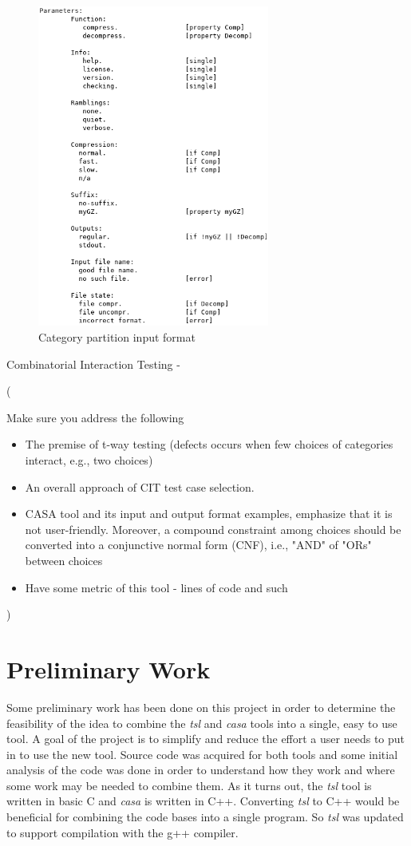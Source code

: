 \documentclass[a4full,12pt]{article}
\newcommand{\eas}[1]{{\color{blue}\sf ({#1})}}
\begin{document}
\begin{figure}[-htb]
\centering
\includegraphics[width=3in,keepaspectratio]{tsl_input.png}
\caption{Category partition input format}
\label{fig:tsl_input}
\end{figure}



Combinatorial Interaction Testing -
\eas{Make sure you address the following
\begin{itemize}
\item The premise of t-way testing (defects occurs when few choices of categories interact, e.g., two choices)
\item An overall approach of CIT test case selection.
\item CASA tool and its input and output format examples, emphasize that it is not user-friendly. Moreover, a compound constraint among choices should be converted into a conjunctive normal form (CNF), i.e., "AND" of "ORs" between choices
\item Have some metric of this tool - lines of code and such
\end{itemize}
}

\section{Preliminary Work}
Some preliminary work has been done on this project in order to determine the
  feasibility of the idea to combine the \emph{tsl} and \emph{casa} tools into 
  a single, easy to use tool. A goal of the project is to simplify and reduce the
  effort a user needs to put in to use the new tool. Source code was acquired for
  both tools and some initial analysis of the code was done in order to understand
  how they work and where some work may be needed to combine them. As it
  turns out, the \emph{tsl} tool is written in basic C and \emph{casa} is written
  in C++. Converting \emph{tsl} to C++ would be beneficial for combining the 
  code bases into a single program. So \emph{tsl} was updated to support compilation
  with the g++ compiler.
\end{document}
